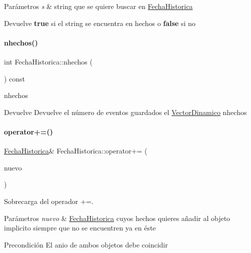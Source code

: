 \begin{DoxyParams}{Parámetros}
{\em s} & string que se quiere buscar en {\ttfamily \hyperlink{classFechaHistorica}{Fecha\+Historica}} \\
\hline
\end{DoxyParams}
\begin{DoxyReturn}{Devuelve}
{\bfseries true} si el string se encuentra en hechos o {\bfseries false} si no 
\end{DoxyReturn}
\mbox{\label{classFechaHistorica_a90873197cc7549c5262b6dc793fc924b}} 
\paragraph{\texorpdfstring{nhechos()}{nhechos()}}
{\footnotesize\ttfamily int Fecha\+Historica\+::nhechos (\begin{DoxyParamCaption}{ }\end{DoxyParamCaption}) const}



nhechos 

\begin{DoxyReturn}{Devuelve}
Devuelve el número de eventos guardados el {\ttfamily \hyperlink{classVectorDinamico}{Vector\+Dinamico}} nhechos 
\end{DoxyReturn}
\mbox{\label{classFechaHistorica_a880169538d2701f3ce908aebd023c9bf}} 
\paragraph{\texorpdfstring{operator+=()}{operator+=()}}
{\footnotesize\ttfamily \hyperlink{classFechaHistorica}{Fecha\+Historica}\& Fecha\+Historica\+::operator+= (\begin{DoxyParamCaption}\item[{const \hyperlink{classFechaHistorica}{Fecha\+Historica} \&}]{nuevo }\end{DoxyParamCaption})}



Sobrecarga del operador +=. 


\begin{DoxyParams}{Parámetros}
{\em nuevo} & \hyperlink{classFechaHistorica}{Fecha\+Historica} cuyos hechos quieres añadir al objeto implicito siempre que no se encuentren ya en éste \\
\hline
\end{DoxyParams}
\begin{DoxyPrecond}{Precondición}
El anio de ambos objetos debe coincidir 
\end{DoxyPrecond}
\mbox{\label{classFechaHistorica_a0b00388fbd4b9bdd3ee879c00f48c25e}} 
